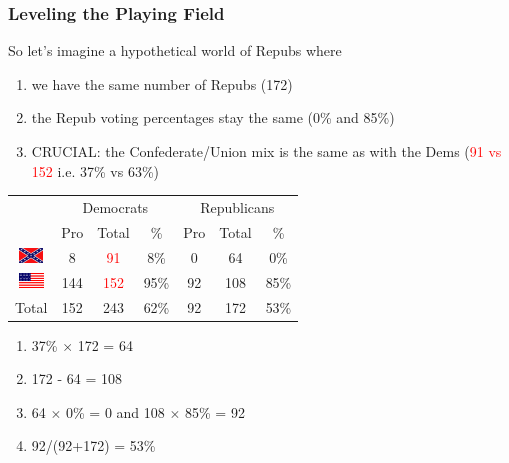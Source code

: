 \documentclass[slides]{beamer}\usepackage[]{graphicx}\usepackage[]{color}
\begin{document}
\begin{frame}
\frametitle{Leveling the Playing Field}
\begin{small}
So let's imagine a hypothetical world of Repubs where
\begin{enumerate}
\item we have the same number of Repubs (172)
\item the Repub voting percentages stay the same (0\% and 85\%)
\item CRUCIAL: the Confederate/Union mix is the same as with the Dems (\textcolor{red}{91 vs 152} i.e. 37\% vs 63\%) 
\end{enumerate}
\end{small}


\begin{center}
	\begin{tabular}{c|ccc|ccc}
     & \multicolumn{3}{c|}{Democrats}  & \multicolumn{3}{c}{Republicans} \\ 
     & Pro & Total & \% & Pro & Total & \% \\ 
     \hline
     \includegraphics[height=0.4cm]{conf} & 8 & \textcolor{red}{91} & 8\% & 0 & 64 & 0\% \\ 
	 \includegraphics[height=0.4cm]{union} & 144 & \textcolor{red}{152} & 95\% & 92 & 108 & 85\% \\ 
    \hline
     Total & 152 & 243 & 62\% & 92 & 172 & 53\% \\ 
  \end{tabular}
\end{center}

\begin{enumerate}
\item 37\% $\times$ 172 = 64
\item 172 - 64 = 108
\item 64 $\times$ 0\% = 0 and 108 $\times$ 85\% = 92
\item 92/(92+172) = 53\%
\end{enumerate}

\end{frame}
\end{document}
